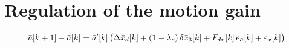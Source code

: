 \clearpage
\section{Regulation of the motion gain}

\[
\bar{a}[k+1] - \bar{a}[k] = \bar{a}'[k]\,\big(\Delta\bar{x}_d[k] + (1-\lambda_c)\,\delta\bar{x}_3[k] + F_{dx}[k]\,e_{\bar{a}}[k] + \varepsilon_x[k]\big)
\]

